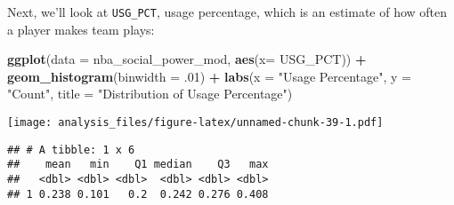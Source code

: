 \documentclass[]{article}
\newenvironment{Shaded}{\begin{snugshade}}{\end{snugshade}}
\newcommand{\DataTypeTok}[1]{\textcolor[rgb]{0.13,0.29,0.53}{#1}}
\newcommand{\DecValTok}[1]{\textcolor[rgb]{0.00,0.00,0.81}{#1}}
\newcommand{\FloatTok}[1]{\textcolor[rgb]{0.00,0.00,0.81}{#1}}
\newcommand{\KeywordTok}[1]{\textcolor[rgb]{0.13,0.29,0.53}{\textbf{#1}}}
\newcommand{\NormalTok}[1]{#1}
\newcommand{\OperatorTok}[1]{\textcolor[rgb]{0.81,0.36,0.00}{\textbf{#1}}}
\newcommand{\StringTok}[1]{\textcolor[rgb]{0.31,0.60,0.02}{#1}}
\begin{document}
Next, we'll look at \texttt{USG\_PCT}, usage percentage, which is an
estimate of how often a player makes team plays:

\begin{Shaded}
\begin{Highlighting}[]
\KeywordTok{ggplot}\NormalTok{(}\DataTypeTok{data =}\NormalTok{ nba_social_power_mod, }\KeywordTok{aes}\NormalTok{(}\DataTypeTok{x=}\NormalTok{ USG_PCT)) }\OperatorTok{+}\StringTok{ }
\StringTok{  }\KeywordTok{geom_histogram}\NormalTok{(}\DataTypeTok{binwidth =} \FloatTok{.01}\NormalTok{) }\OperatorTok{+}
\StringTok{  }\KeywordTok{labs}\NormalTok{(}\DataTypeTok{x =} \StringTok{"Usage Percentage"}\NormalTok{, }\DataTypeTok{y =} \StringTok{"Count"}\NormalTok{,}
       \DataTypeTok{title =} \StringTok{"Distribution of Usage Percentage"}\NormalTok{)}
\end{Highlighting}
\end{Shaded}

\texttt{[image: analysis\_files/figure-latex/unnamed-chunk-39-1.pdf]}

\begin{Shaded}
\end{Shaded}

\begin{verbatim}
## # A tibble: 1 x 6
##    mean   min    Q1 median    Q3   max
##   <dbl> <dbl> <dbl>  <dbl> <dbl> <dbl>
## 1 0.238 0.101   0.2  0.242 0.276 0.408
\end{verbatim}

\begin{Shaded}
\end{Shaded}
\end{document}
